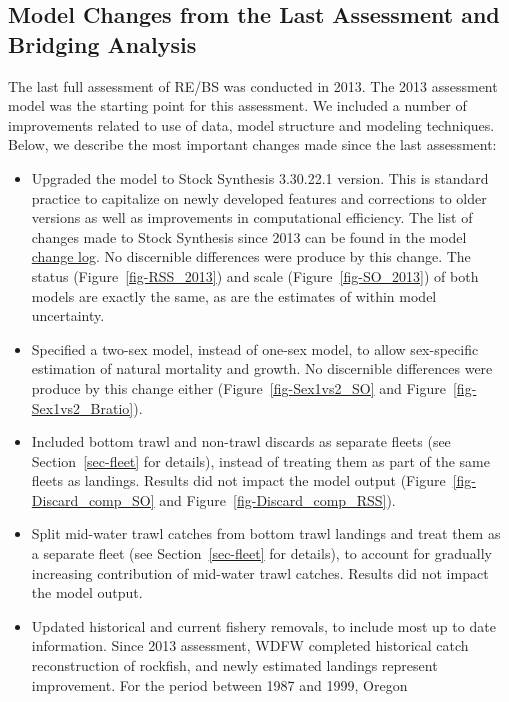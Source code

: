 \documentclass[
]{scrartcl}
\providecommand{\tightlist}{%
  \setlength{\itemsep}{0pt}\setlength{\parskip}{0pt}}\usepackage{longtable,booktabs,array}
\begin{document}
\subsection{Model Changes from the Last Assessment and Bridging
Analysis}\label{sec-bridging}

The last full assessment of RE/BS was conducted in 2013. The 2013
assessment model was the starting point for this assessment. We included
a number of improvements related to use of data, model structure and
modeling techniques. Below, we describe the most important changes made
since the last assessment:

\begin{itemize}
\tightlist
\item
  Upgraded the model to Stock Synthesis 3.30.22.1 version. This is
  standard practice to capitalize on newly developed features and
  corrections to older versions as well as improvements in computational
  efficiency. The list of changes made to Stock Synthesis since 2013 can
  be found in the model
  \href{https://github.com/orgs/nmfs-ost/projects/11}{change log}. No
  discernible differences were produce by this change. The status
  (Figure~\ref{fig-RSS_2013}) and scale (Figure~\ref{fig-SO_2013}) of
  both models are exactly the same, as are the estimates of within model
  uncertainty.
\item
  Specified a two-sex model, instead of one-sex model, to allow
  sex-specific estimation of natural mortality and growth. No
  discernible differences were produce by this change either
  (Figure~\ref{fig-Sex1vs2_SO} and Figure~\ref{fig-Sex1vs2_Bratio}).
\item
  Included bottom trawl and non-trawl discards as separate fleets (see
  Section~\ref{sec-fleet} for details), instead of treating them as part
  of the same fleets as landings. Results did not impact the model
  output (Figure~\ref{fig-Discard_comp_SO} and
  Figure~\ref{fig-Discard_comp_RSS}).
\item
  Split mid-water trawl catches from bottom trawl landings and treat
  them as a separate fleet (see Section~\ref{sec-fleet} for details), to
  account for gradually increasing contribution of mid-water trawl
  catches. Results did not impact the model output.
\item
  Updated historical and current fishery removals, to include most up to
  date information. Since 2013 assessment, WDFW completed historical
  catch reconstruction of rockfish, and newly estimated landings
  represent improvement. For the period between 1987 and 1999, Oregon

\end{itemize}
\end{document}
